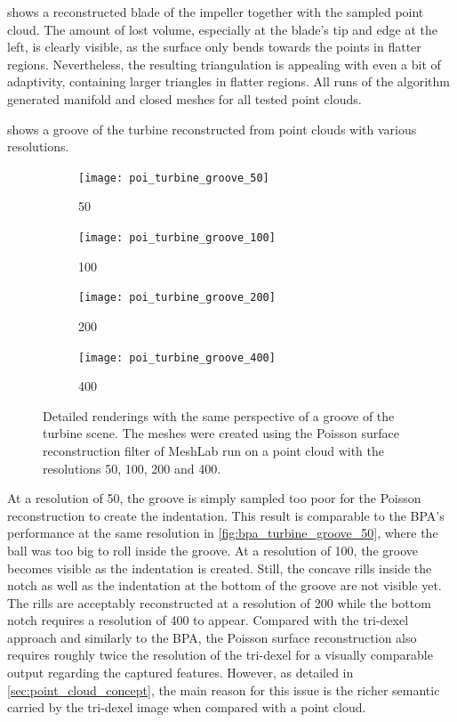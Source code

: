  shows a reconstructed blade of the impeller together with the sampled point cloud.
The amount of lost volume, especially at the blade's tip and edge at the left, is clearly visible, as the surface only bends towards the points in flatter regions.
Nevertheless, the resulting triangulation is appealing with even a bit of adaptivity, containing larger triangles in flatter regions.
All runs of the algorithm generated manifold and closed meshes for all tested point clouds.

 shows a groove of the turbine reconstructed from point clouds with various resolutions.
%
\begin{figure}
	\begin{subfigure}[b]{0.24\textwidth}
		\centering
		\texttt{[image: poi\_turbine\_groove\_50]}
		\caption{50}
		\label{fig:poi_turbine_groove_50}
	\end{subfigure}
	\begin{subfigure}[b]{0.24\textwidth}
		\centering
		\texttt{[image: poi\_turbine\_groove\_100]}
		\caption{100}
		\label{fig:poi_turbine_groove_100}
	\end{subfigure}
	\begin{subfigure}[b]{0.24\textwidth}
		\centering
		\texttt{[image: poi\_turbine\_groove\_200]}
		\caption{200}
		\label{fig:poi_turbine_groove_200}
	\end{subfigure}
	\begin{subfigure}[b]{0.24\textwidth}
		\centering
		\texttt{[image: poi\_turbine\_groove\_400]}
		\caption{400}
		\label{fig:poi_turbine_groove_400}
	\end{subfigure}
	\caption{
		Detailed renderings with the same perspective of a groove of the turbine scene.
		The meshes were created using the Poisson surface reconstruction filter of MeshLab run on a point cloud with the resolutions 50, 100, 200 and 400.
	}
	\label{fig:poi_grooves}
\end{figure}
%
At a resolution of 50, the groove is simply sampled too poor for the Poisson reconstruction to create the indentation.
This result is comparable to the BPA's performance at the same resolution in \cref{fig:bpa_turbine_groove_50}, where the ball was too big to roll inside the groove.
At a resolution of 100, the groove becomes visible as the indentation is created.
Still, the concave rills inside the notch as well as the indentation at the bottom of the groove are not visible yet.
The rills are acceptably reconstructed at a resolution of 200 while the bottom notch requires a resolution of 400 to appear.
Compared with the tri-dexel approach and similarly to the BPA, the Poisson surface reconstruction also requires roughly twice the resolution of the tri-dexel for a visually comparable output regarding the captured features.
However, as detailed in \cref{sec:point_cloud_concept}, the main reason for this issue is the richer semantic carried by the tri-dexel image when compared with a point cloud.

